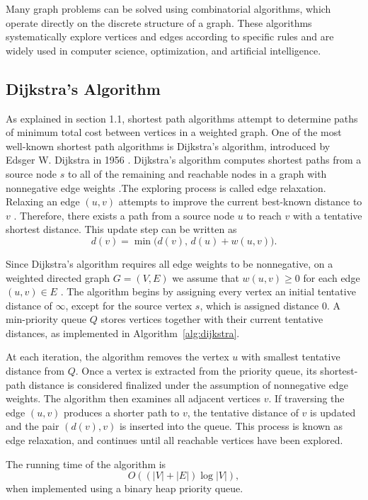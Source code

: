 \documentclass[12pt]{report}
\begin{document}
Many graph problems can be solved using combinatorial algorithms, which operate directly on the discrete structure of a graph. These algorithms systematically explore vertices and edges according to specific rules and are widely used in computer science, optimization, and artificial intelligence.

\subsection{Dijkstra’s Algorithm}

As explained in section 1.1, shortest path algorithms attempt to determine paths of minimum total cost between vertices in a weighted graph. One of the most well-known shortest path algorithms is Dijkstra's algorithm, introduced by Edsger W. Dijkstra in 1956 \cite{Ortega}. Dijkstra's algorithm computes shortest paths from a source node $s$ to all of the remaining and reachable nodes in a graph with nonnegative edge weights \cite{Ortega}.The exploring process is called edge relaxation. Relaxing an edge $(u,v)$ attempts to improve the current best-known distance to $v$ \cite{Ortega}. Therefore, there exists a path from a source node $u$ to reach $v$ with a tentative shortest distance. This update step can be written as
\[
d(v) = \min\big(d(v),\, d(u) + w(u,v)\big).
\]

Since Dijkstra's algorithm requires all edge weights to be nonnegative, on a weighted directed graph $G = (V,E)$ we assume that $w(u,v) \geq 0$ for each edge $(u,v) \in E$ \cite{Ortega}. The algorithm begins by assigning every vertex an initial tentative distance of $\infty$, except for the source vertex $s$, which is assigned distance $0$. A min-priority queue $Q$ stores vertices together with their current tentative distances, as implemented in Algorithm~\ref{alg:dijkstra}.

At each iteration, the algorithm removes the vertex $u$ with smallest tentative distance from $Q$. Once a vertex is extracted from the priority queue, its shortest-path distance is considered finalized under the assumption of nonnegative edge weights. The algorithm then examines all adjacent vertices $v$. If traversing the edge $(u,v)$ produces a shorter path to $v$, the tentative distance of $v$ is updated and the pair $(d(v),v)$ is inserted into the queue. This process is known as edge relaxation, and continues until all reachable vertices have been explored.

The running time of the algorithm is
\[
O((|V| + |E|)\log |V|),
\]
when implemented using a binary heap priority queue.
\end{document}
